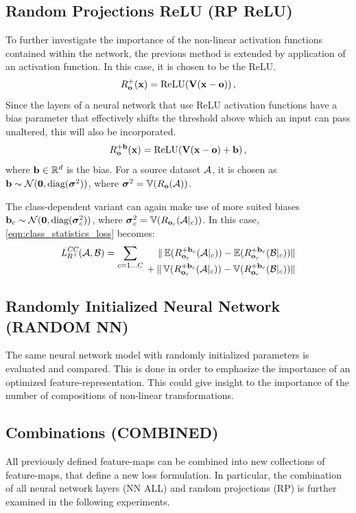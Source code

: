 \subsection{Random Projections ReLU (RP ReLU)}
To further investigate the importance of the non-linear activation functions 
contained within the network,
the previous method is extended by application of an activation function.
In this case, it is chosen to be the ReLU.
% 
\[
    R_{\vec o}^+ (\vec x) = \relu(\vec V (\vec x - \vec o)) \,,
\]
Since the layers of a neural network that use ReLU activation functions have a bias parameter that effectively shifts the threshold above which an input can pass unaltered, this will also be incorporated.
\[
    R_{\vec o}^{+\vec b} (\vec x) = \relu(\vec V (\vec x - \vec o) + \vec b) \,,
\]
where $\vec b \in \R^d$ is the bias. For a source dataset $\set A$, it is chosen as $\vec b \sim \mathcal N(\vec 0, \textnormal{diag}(\boldsymbol \sigma ^2))$, 
where $\boldsymbol \sigma ^2 = \var ({R_{\vec o}(\set A)})$.

The class-dependent variant can again make use of more suited biases $\vec b_c \sim \mathcal N( \vec 0, \textnormal{diag}(\boldsymbol \sigma _c^2))$, 
where $\boldsymbol \sigma_c ^2 = \var ({R_{\vec o_c}(\set A|_c)})$.
In this case, \cref{eqn:class_statistics_loss} becomes:
% 
\begin{equation*}
    \lossCC _{R^+} (\set A, \set B) =
    \sum _{c = 1 \dots C}
    \begin{alignedat}[t]{1}
        \|\mean ({R_{\vec o_c}^{+\vec b_c} (\set A|_c)}) - \mean ({R_{\vec o_c}^{+\vec b_c} (\set B|_c)}) &\| \\
        {} + \|\var ({R_{\vec o_c}^{+\vec b_c} (\set A|_c)}) - \var ({R_{\vec o_c}^{+\vec b_c} (\set B|_c)}) &\| 
    \end{alignedat}
\end{equation*}

\subsection{Randomly Initialized Neural Network (RANDOM NN)}
The same neural network model with randomly initialized parameters is evaluated and compared.
This is done in order to emphasize the importance of an optimized feature-representation.
This could give insight to the importance of the number of compositions of non-linear transformations.

\subsection{Combinations (COMBINED)}
All previously defined feature-maps can be combined into new collections of feature-maps,
that define a new loss formulation.
In particular, the combination of all neural network layers (NN ALL) and random projections (RP) is further examined in the following experiments.


